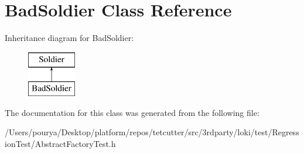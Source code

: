 \hypertarget{classBadSoldier}{}\section{Bad\+Soldier Class Reference}
\label{classBadSoldier}
Inheritance diagram for Bad\+Soldier\+:\begin{figure}[H]
\begin{center}
\leavevmode
\includegraphics[height=2.000000cm]{classBadSoldier}
\end{center}
\end{figure}


The documentation for this class was generated from the following file\+:\begin{DoxyCompactItemize}
\item 
/\+Users/pourya/\+Desktop/platform/repos/tetcutter/src/3rdparty/loki/test/\+Regression\+Test/Abstract\+Factory\+Test.\+h\end{DoxyCompactItemize}
